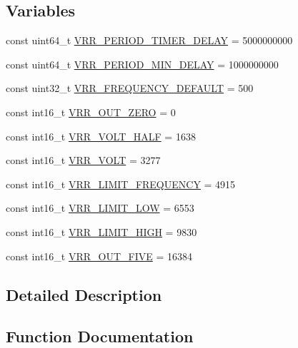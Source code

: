 \subsection*{Variables}
\begin{DoxyCompactItemize}
\item 
const uint64\+\_\+t \hyperlink{group___v_r_r__module_gadc0a5545fe71ae0a54e9790b83f3cc35}{V\+R\+R\+\_\+\+P\+E\+R\+I\+O\+D\+\_\+\+T\+I\+M\+E\+R\+\_\+\+D\+E\+L\+A\+Y} = 5000000000
\item 
const uint64\+\_\+t \hyperlink{group___v_r_r__module_ga6dcb39a1c723e97c190362e56504ce0f}{V\+R\+R\+\_\+\+P\+E\+R\+I\+O\+D\+\_\+\+M\+I\+N\+\_\+\+D\+E\+L\+A\+Y} = 1000000000
\item 
const uint32\+\_\+t \hyperlink{group___v_r_r__module_ga9cff33455fa636577df049d46c6a732c}{V\+R\+R\+\_\+\+F\+R\+E\+Q\+U\+E\+N\+C\+Y\+\_\+\+D\+E\+F\+A\+U\+L\+T} = 500
\item 
const int16\+\_\+t \hyperlink{group___v_r_r__module_gad55bb968f6baf24de7bc84da9af56299}{V\+R\+R\+\_\+\+O\+U\+T\+\_\+\+Z\+E\+R\+O} = 0
\item 
const int16\+\_\+t \hyperlink{group___v_r_r__module_gab6986e66860b0f542175fa87d09b9b0c}{V\+R\+R\+\_\+\+V\+O\+L\+T\+\_\+\+H\+A\+L\+F} = 1638
\item 
const int16\+\_\+t \hyperlink{group___v_r_r__module_gad3aaefa339469ae93a965e64c9e19695}{V\+R\+R\+\_\+\+V\+O\+L\+T} = 3277
\item 
const int16\+\_\+t \hyperlink{group___v_r_r__module_ga9475d7ceaf1b4b9d63d458bc8df3c5e0}{V\+R\+R\+\_\+\+L\+I\+M\+I\+T\+\_\+\+F\+R\+E\+Q\+U\+E\+N\+C\+Y} = 4915
\item 
const int16\+\_\+t \hyperlink{group___v_r_r__module_ga18eb3dafde58338caa5182fc2c2e9d82}{V\+R\+R\+\_\+\+L\+I\+M\+I\+T\+\_\+\+L\+O\+W} = 6553
\item 
const int16\+\_\+t \hyperlink{group___v_r_r__module_gaf47e40bfdb9ee19a02d47d30cfca0237}{V\+R\+R\+\_\+\+L\+I\+M\+I\+T\+\_\+\+H\+I\+G\+H} = 9830
\item 
const int16\+\_\+t \hyperlink{group___v_r_r__module_gadc76104466768c55588f9dfa0d80d851}{V\+R\+R\+\_\+\+O\+U\+T\+\_\+\+F\+I\+V\+E} = 16384
\end{DoxyCompactItemize}


\subsection{Detailed Description}


\subsection{Function Documentation}
\hypertarget{group___v_r_r__module_ga77bce40d62678d121ab09cb771c49493}{}
